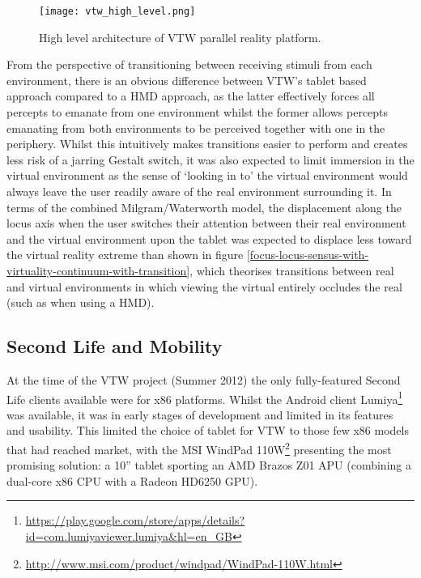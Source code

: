 \begin{figure}[h]
\centering
  \texttt{[image: vtw\_high\_level.png]}
  \caption{High level architecture of VTW parallel reality platform.}
  \label{vtw_high_level.png}
\end{figure}

From the perspective of transitioning between receiving stimuli from each environment, there is an obvious difference between VTW's tablet based approach compared to a HMD approach, as the latter effectively forces all percepts to emanate from one environment whilst the former allows percepts emanating from both environments to be perceived together with one in the periphery. Whilst this intuitively makes transitions easier to perform and creates less risk of a jarring Gestalt switch, it was also expected to limit immersion in the virtual environment as the sense of `looking in to' the virtual environment would always leave the user readily aware of the real environment surrounding it. In terms of the combined Milgram/Waterworth model, the displacement along the locus axis when the user switches their attention between their real environment and the virtual environment upon the tablet was expected to displace less toward the virtual reality extreme than shown in figure \ref{focus-locus-sensus-with-virtuality-continuum-with-transition}, which theorises transitions between real and virtual environments in which viewing the virtual entirely occludes the real (such as when using a HMD).



\subsection{Second Life and Mobility}

\label{SecondLifeMobility}

\newcommand{\LumiyaFootnote}{\footnote{\url{https://play.google.com/store/apps/details?id=com.lumiyaviewer.lumiya&hl=en_GB}}}

\newcommand{\WindpadFootnote}{\footnote{\url{http://www.msi.com/product/windpad/WindPad-110W.html}}}


At the time of the VTW project (Summer 2012) the only fully-featured Second Life clients available were for x86 platforms. Whilst the Android client Lumiya\LumiyaFootnote{} was available, it was in early stages of development and limited in its features and usability. This limited the choice of tablet for VTW to those few x86 models that had reached market, with the MSI WindPad 110W\WindpadFootnote{} presenting the most promising solution: a 10'' tablet sporting an AMD Brazos Z01 APU (combining a dual-core x86 CPU with a Radeon HD6250 GPU).

